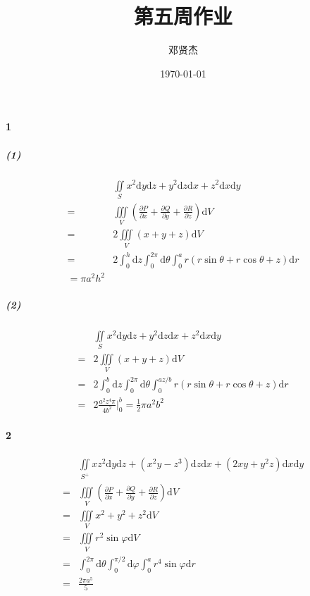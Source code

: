 \documentclass[UTF8]{ctexart}
\title{第五周作业}
\author{邓贤杰}
\date{\today}
\begin{document}
    \maketitle
    \paragraph*{1}
        \subparagraph*{(1)}
        \begin{align*}
            &\iint \limits_S x^2 \mathrm{d}y \mathrm{d}z + y^2 \mathrm{d}z \mathrm{d}x + z^2 \mathrm{d}x \mathrm{d}y \\
            =& \iiint \limits_{V} \left(\frac{\partial P}{\partial x} +
            \frac{\partial Q}{\partial y} +
            \frac{\partial R}{\partial z} \right) \mathrm{d}V \\
            =& 2 \iiint \limits_{V} (x+y+z) \mathrm{d}V\\
            =& 2 \int_{0}^{h} \mathrm{d}z \int_{0}^{2\pi} \mathrm{d}\theta  \int_{0}^{a} r(r \sin \theta + r\cos\theta +z) \mathrm{d}r \\
            =\pi a^2 h^2
        \end{align*}
        \subparagraph*{(2)}
        \begin{align*}
            &\iint \limits_S x^2 \mathrm{d}y \mathrm{d}z + y^2 \mathrm{d}z \mathrm{d}x + z^2 \mathrm{d}x \mathrm{d}y \\
            =& 2 \iiint \limits_{V} (x+y+z)\mathrm{d}V \\
            =& 2 \int_{0}^{b} \mathrm{d}z \int_{0}^{2\pi} \mathrm{d}\theta 
            \int_{0}^{az/b} r(r\sin\theta+r\cos\theta+z)\mathrm{d}r \\
            =& 2 \frac{a^2z^4\pi}{4b^2} \big|_{0}^{b}  =  \frac{1}{2} \pi a^2 b^2
        \end{align*}
    \paragraph*{2}
    \begin{align*}
        &\iint \limits_{S^+} xz^2 \mathrm{d}y \mathrm{d}z +
        (x^2y-z^3)\mathrm{d}z \mathrm{d}x +
        (2xy+y^2z)\mathrm{d}x \mathrm{d}y \\ 
            =& \iiint \limits_{V} \left(\frac{\partial P}{\partial x} +
            \frac{\partial Q}{\partial y} +
            \frac{\partial R}{\partial z} \right) \mathrm{d}V \\
            =& \iiint \limits_{V} x^2+y^2+z^2 \mathrm{d}V \\
            =& \iiint \limits_{V} r^2 \sin\varphi \mathrm{d}V \\
            =& \int_{0}^{2\pi} \mathrm{d}\theta \int_{0}^{\pi/2} \mathrm{d}\varphi\int_{0}^{a} r^4 \sin \varphi \mathrm{d}r \\
            =& \frac{2\pi a^5}{5} 
    \end{align*}
\end{document}
